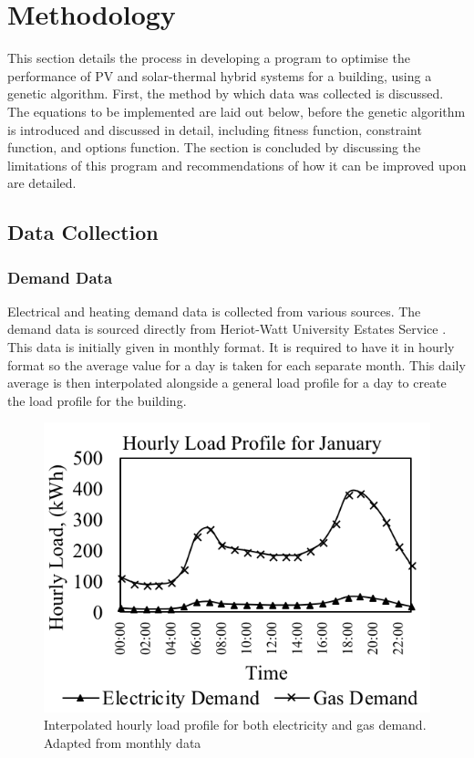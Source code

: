 \section{Methodology}

This section details the process in developing a program to optimise the performance of PV and solar-thermal hybrid systems for a building, using a genetic algorithm. First, the method by which data was collected is discussed. The equations to be implemented are laid out below, before the genetic algorithm is introduced and discussed in detail, including fitness function, constraint function, and options function. The section is concluded by discussing the limitations of this program and recommendations of how it can be improved upon are detailed.

\subsection{Data Collection}

\subsubsection{Demand Data}

Electrical and heating demand data is collected from various sources. The demand data is sourced directly from Heriot-Watt University Estates Service \cite{HWES}. This data is initially given in monthly format. It is required to have it in hourly format so the average value for a day is taken for each separate month. This daily average is then interpolated alongside a general load profile for a day to create the load profile for the building.

\begin{figure}[h!]
	\centering
    \includegraphics[width=1\hsize]{Figures/LoadProfiles.png}
    \caption{Interpolated hourly load profile for both electricity and gas demand. Adapted from monthly data  \cite{HWES}}
    \label{fig:LoadProfiles}
  \end{figure}
  
